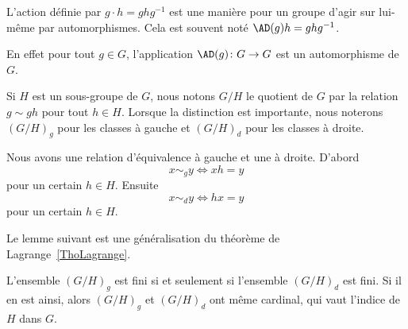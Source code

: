 \begin{definition}      \label{DEFooCORTooEeOLPT}
	L'action  définie par \( g\cdot h=ghg^{-1}\) est une manière pour un groupe d'agir sur lui-même par automorphismes. Cela est souvent noté \( \AD(g)h=ghg^{-1}\).
\end{definition}
En effet pour tout \( g\in G\), l'application \( \AD(g)\colon G\to G\) est un automorphisme de \( G\).

Si \( H\) est un sous-groupe de  \( G\), nous notons \( G/H\) le quotient de $G$ par la relation \( g\sim gh\) pour tout \( h\in H\). Lorsque la distinction est importante, nous noterons \( (G/H)_g\) pour les classes à gauche et \( (G/H)_d\) pour les classes à droite.

Nous avons une relation d'équivalence à gauche et une à droite. D'abord
\begin{equation}
	x\sim_g y\Leftrightarrow xh=y
\end{equation}
pour un certain \( h\in H\). Ensuite
\begin{equation}
	x\sim_d y\Leftrightarrow hx=y
\end{equation}
pour un certain \( h\in H\).

Le lemme suivant est une généralisation du théorème de Lagrange~\ref{ThoLagrange}.

\begin{lemma}
	L'ensemble \( (G/H)_g\) est fini si et seulement si l'ensemble \( (G/H)_d\) est fini. Si il en est ainsi, alors \( (G/H)_g\) et \( (G/H)_d\) ont même cardinal, qui vaut l'indice de \( H\) dans \( G\).
\end{lemma}

